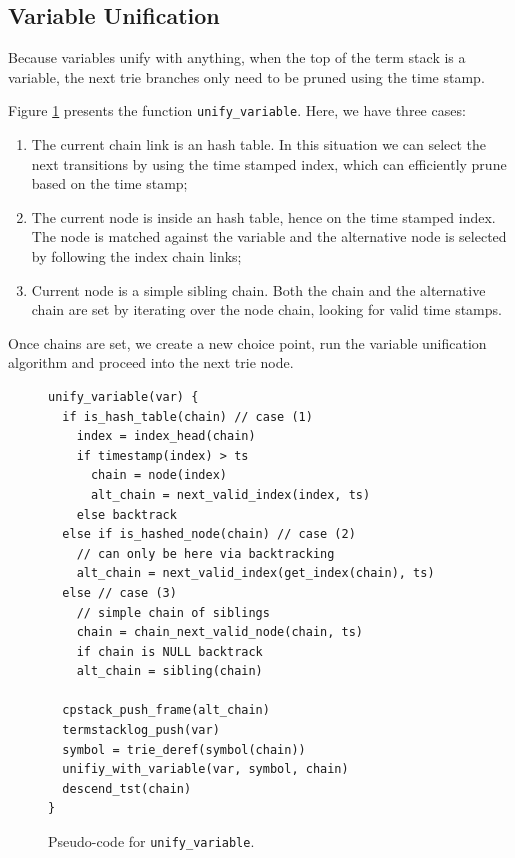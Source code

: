 \subsection{Variable Unification}

Because variables unify with anything, when the top of the term
stack is a variable, the next trie branches only need to be pruned using the time stamp.

Figure \ref{fig:unify_variable} presents the function
\texttt{unify\_variable}. Here, we have three cases:

\begin{enumerate}
  \item The current chain link is an hash table. In this situation we can select the next transitions by using the time stamped index, which can efficiently prune based on the time stamp;
  \item The current node is inside an hash table, hence on the time stamped index. The node is matched against the variable and the alternative node is selected by following the index chain links;
  \item Current node is a simple sibling chain. Both the chain and the alternative chain are set by iterating over the node chain, looking for valid time stamps.
\end{enumerate}

Once chains are set, we create a new choice point, run the variable unification algorithm
and proceed into the next trie node.

\begin{figure}[ht]
\begin{Verbatim}
unify_variable(var) {
  if is_hash_table(chain) // case (1)
    index = index_head(chain)
    if timestamp(index) > ts
      chain = node(index)
      alt_chain = next_valid_index(index, ts)
    else backtrack
  else if is_hashed_node(chain) // case (2)
    // can only be here via backtracking
    alt_chain = next_valid_index(get_index(chain), ts)
  else // case (3)
    // simple chain of siblings
    chain = chain_next_valid_node(chain, ts)
    if chain is NULL backtrack
    alt_chain = sibling(chain)
  
  cpstack_push_frame(alt_chain)
  termstacklog_push(var)
  symbol = trie_deref(symbol(chain))
  unifiy_with_variable(var, symbol, chain)
  descend_tst(chain)
}
\end{Verbatim}
\caption{Pseudo-code for \texttt{unify\_variable}.}
\label{fig:unify_variable}
\end{figure}

